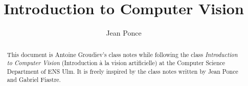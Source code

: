\documentclass[toc, titlepaged]{../cs-classes/cs-classes}
\title{Introduction to Computer Vision}
\author{Jean Ponce}
\begin{document}
\begin{abstract}
    This document is Antoine Groudiev's class notes while following the class \emph{Introduction to Computer Vision} (Introduction à la vision artificielle) at the Computer Science Department of ENS Ulm. It is freely inspired by the class notes written by Jean Ponce and Gabriel Fiastre.
\end{abstract}










\end{document}
